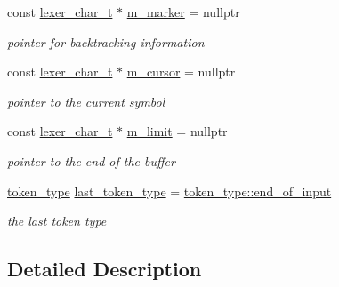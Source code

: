 \begin{DoxyCompactItemize}
const \hyperlink{classnlohmann_1_1basic__json_1_1lexer_abe04be04d0575249f8806c334bacbc80}{lexer\+\_\+char\+\_\+t} $\ast$ \hyperlink{classnlohmann_1_1basic__json_1_1lexer_a1a9ad4e31a33a32943f1c102f1fa7d59}{m\+\_\+marker} = nullptr
\begin{DoxyCompactList}\small\item\em pointer for backtracking information \end{DoxyCompactList}\item 
const \hyperlink{classnlohmann_1_1basic__json_1_1lexer_abe04be04d0575249f8806c334bacbc80}{lexer\+\_\+char\+\_\+t} $\ast$ \hyperlink{classnlohmann_1_1basic__json_1_1lexer_a13872f4378b6a140e1125160bfa8e92e}{m\+\_\+cursor} = nullptr
\begin{DoxyCompactList}\small\item\em pointer to the current symbol \end{DoxyCompactList}\item 
const \hyperlink{classnlohmann_1_1basic__json_1_1lexer_abe04be04d0575249f8806c334bacbc80}{lexer\+\_\+char\+\_\+t} $\ast$ \hyperlink{classnlohmann_1_1basic__json_1_1lexer_a460d53a59d243782845ab6571e53dcc1}{m\+\_\+limit} = nullptr
\begin{DoxyCompactList}\small\item\em pointer to the end of the buffer \end{DoxyCompactList}\item 
\hyperlink{classnlohmann_1_1basic__json_1_1lexer_a96887d6cd131e3d3a85a9d71fbdbcdf7}{token\+\_\+type} \hyperlink{classnlohmann_1_1basic__json_1_1lexer_a2ad8bad3a2224be7fdd4e4bb0f757a0e}{last\+\_\+token\+\_\+type} = \hyperlink{classnlohmann_1_1basic__json_1_1lexer_a96887d6cd131e3d3a85a9d71fbdbcdf7aca11f56dd477c09e06583dbdcda0985f}{token\+\_\+type\+::end\+\_\+of\+\_\+input}
\begin{DoxyCompactList}\small\item\em the last token type \end{DoxyCompactList}\end{DoxyCompactItemize}


\subsection{Detailed Description}
